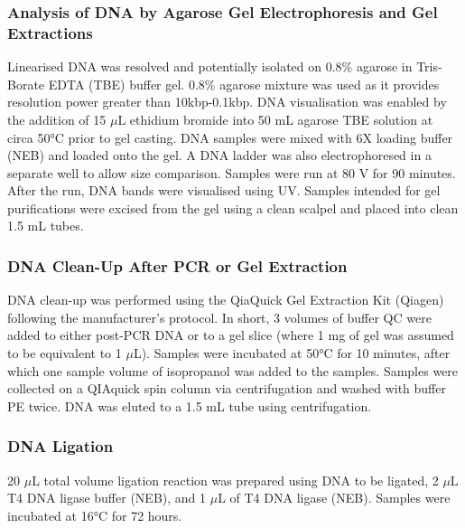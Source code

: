 \subsubsection[DNA Agarose Gel Electrophoresis and Extractions]{Analysis of DNA by Agarose Gel Electrophoresis and Gel Extractions} \label{Analysis of DNA by Agarose Gel Electrophoresis and Gel Extractions}
Linearised DNA was resolved and potentially isolated on 0.8\% agarose in Tris-Borate EDTA (TBE) buffer gel. 0.8\% agarose mixture was used as it provides resolution power greater than 10kbp-0.1kbp. DNA visualisation was enabled by the addition of 15 \(\mu\)L ethidium bromide into 50 mL agarose TBE solution at circa 50°C prior to gel casting. DNA samples were mixed with 6X loading buffer (NEB) and loaded onto the gel. A DNA ladder was also electrophoresed in a separate well to allow size comparison. Samples were run at 80 V for 90 minutes. After the run, DNA bands were visualised using UV. Samples intended for gel purifications were excised from the gel using a clean scalpel and placed into clean 1.5 mL tubes.

\subsubsection{DNA Clean-Up After PCR or Gel Extraction} \label{DNA Clean-Up After PCR or Gel Extraction}
DNA clean-up was performed using the QiaQuick Gel Extraction Kit (Qiagen) following the manufacturer's protocol. In short, 3 volumes of buffer QC were added to either post-PCR DNA or to a gel slice (where 1 mg of gel was assumed to be equivalent to 1 \(\mu\)L). Samples were incubated at 50°C for 10 minutes, after which one sample volume of isopropanol was added to the samples. Samples were collected on a QIAquick spin column via centrifugation and washed with buffer PE twice. DNA was eluted to a 1.5 mL tube using centrifugation.

\subsubsection{DNA Ligation} \label{DNA Ligation}
20 \(\mu\)L total volume ligation reaction was prepared using DNA to be ligated, 2 \(\mu\)L T4 DNA ligase buffer (NEB), and 1 \(\mu\)L of T4 DNA ligase (NEB). Samples were incubated at 16°C for 72 hours.

